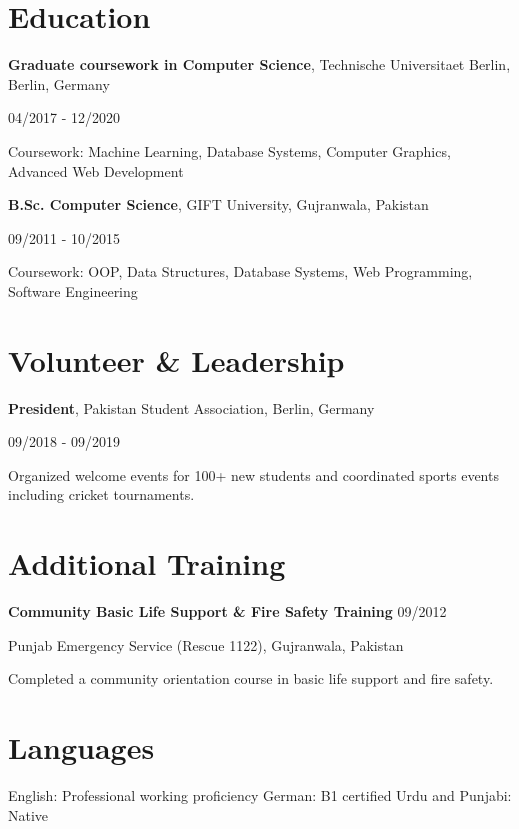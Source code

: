 \documentclass[10pt,a4paper]{article}
\begin{document}
\section*{Education}
\textbf{Graduate coursework in Computer Science}, Technische Universitaet Berlin, Berlin, Germany\par
04/2017 - 12/2020\par
Coursework: Machine Learning, Database Systems, Computer Graphics, Advanced Web Development\par
\textbf{B.Sc. Computer Science}, GIFT University, Gujranwala, Pakistan\par
09/2011 - 10/2015\par
Coursework: OOP, Data Structures, Database Systems, Web Programming, Software Engineering

\section*{Volunteer \& Leadership}
\textbf{President}, Pakistan Student Association, Berlin, Germany\par
09/2018 - 09/2019\par
Organized welcome events for 100+ new students and coordinated sports events including cricket tournaments.

\section*{Additional Training}
\textbf{Community Basic Life Support \& Fire Safety Training} \textbar{} 09/2012\par
Punjab Emergency Service (Rescue 1122), Gujranwala, Pakistan\par
Completed a community orientation course in basic life support and fire safety.

\section*{Languages}
English: Professional working proficiency \textbar{} German: B1 certified \textbar{} Urdu and Punjabi: Native
\end{document}
